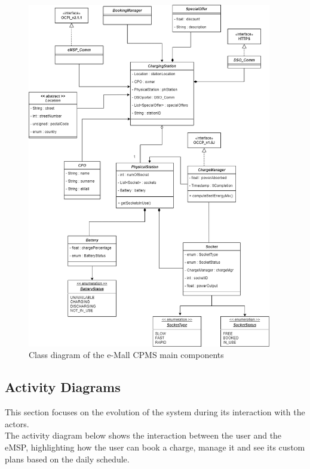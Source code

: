 \documentclass[12pt]{report}
\begin{document}
\begin{figure}[h]
    \centering
    \includegraphics[width = 0.95\textwidth]{assets/e-Mall CPMS.drawio (1).png}
    \caption{Class diagram of the e-Mall CPMS main components}
    \label{fig:my_label}
\end{figure}
\clearpage

\subsection{Activity Diagrams}
This section focuses on the evolution of the system during its interaction with the actors.\\
The activity diagram below shows the interaction between the user and the eMSP, highlighting how the user can book a charge, manage it and see its custom plans based on the daily schedule.

\bigskip
\end{document}
